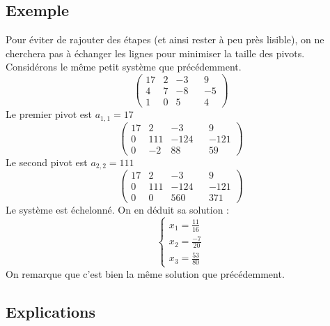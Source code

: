 \documentclass[french]{article}
\begin{document}
\subsection{Exemple}
Pour éviter de rajouter des étapes (et ainsi rester à peu près lisible), on ne cherchera pas à échanger les lignes pour minimiser la taille des pivots. Considérons le même petit système que précédemment.
\begin{equation*}
	\begin{pmatrix}
		17 & 2 & -3 & & 9\\
		4 & 7 & -8 & & -5\\
		1 & 0 & 5 & & 4
	\end{pmatrix}
\end{equation*}
Le premier pivot est $a_{1,1} = 17$
\begin{equation*}
	\begin{pmatrix}
		17 & 2 & -3 & & 9\\
		0 & 111 & -124 & & -121\\
		0 & -2 & 88 & & 59
	\end{pmatrix}
\end{equation*}
Le second pivot est $a_{2,2} = 111$
\begin{equation*}
	\begin{pmatrix}
		17 & 2 & -3  & & 9\\
		0 & 111 & -124 & & -121\\
		0 & 0 & 560 & & 371
	\end{pmatrix}
\end{equation*}
Le système est échelonné. On en déduit sa solution :
\begin{equation*}
	\begin{cases}
		x_1 = \frac{11}{16}\\
		x_2 = \frac{-7}{20}\\
		x_3 = \frac{53}{80}
	\end{cases}
\end{equation*}
On remarque que c'est bien la même solution que précédemment.
\subsection{Explications}
\end{document}
